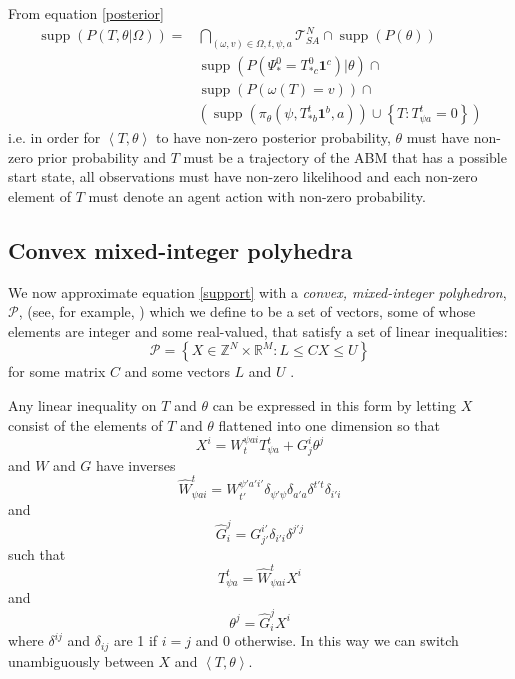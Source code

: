 \documentclass{article}
\DeclareMathOperator\supp{supp}
\begin{document}
From equation \eqref{posterior}
\begin{equation}
\begin{aligned}
\supp (P( T,\theta |\Omega)) = 
& \bigcap_{(\omega,v) \in \Omega,t, \psi, a} \mathcal{T}^N_{SA} \cap \supp(P(\theta)) \\ 
&\supp(P(\Psi^0_* = T^0_{* c}\mathbf{1}^c)|\theta) \cap \\
& \supp\left(P\left(\omega(T)=v\right)\right) \cap \\
&\left( \supp\left(\pi_\theta(\psi,T^t_{* b}\mathbf{1}^b,a)\right) \cup \left\{T:T^t_{\psi a} = 0\right\} \right)
\end{aligned}
\label{support}
\end{equation}
i.e. in order for $\left<T,\theta\right>$ to have non-zero posterior probability, $\theta$ must have non-zero prior probability and $T$ must be a trajectory of the ABM that has a possible start state, all observations must have non-zero likelihood and each non-zero element of $T$ must denote an agent action with non-zero probability.

\subsection{Convex mixed-integer polyhedra}
\label{BPoly}

We now approximate equation \eqref{support} with a \textit{convex, mixed-integer polyhedron}, $\mathcal{P}$, (see, for example, \citet{conforti2010polyhedral}) which we define to be a set of vectors, some of whose elements are integer and some real-valued, that satisfy a set of linear inequalities:
\[
\mathcal{P} = \left\{ X\in\mathbb{Z}^N \times \mathbb{R}^M : L \le  CX \le U \right\}
\]
for some matrix $C$ and some vectors $L$ and $U$ .

Any linear inequality on $T$ and $\theta$ can be expressed in this form by letting $X$ consist of the elements of $T$ and $\theta$ flattened into one dimension so that
\[
X^i = W^{\psi a i}_{t}T^t_{\psi a} + G^i_j\theta^j
\]
and $W$ and $G$ have inverses
\[
\hat{W}^t_{\psi a i} = W^{\psi' a' i'}_{t'}\delta_{\psi'\psi}\delta_{a'a}\delta^{t't}\delta_{i'i}
\]
and
\[
\hat{G}^j_i = G^{i'}_{j'}\delta_{i'i}\delta^{j'j}
\]
such that
\[
T^t_{\psi a} = \hat{W}^{t}_{\psi a i}X^i
\]
and
\[
\theta^j = \hat{G}^{j}_{i} X^i
\]
where $\delta^{ij}$ and $\delta_{ij}$ are 1 if $i=j$ and 0 otherwise. In this way we can switch unambiguously between $X$ and $\left<T,\theta\right>$.
\end{document}
